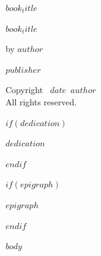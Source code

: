 \documentclass[12pt]{memoir}
\def\booktitle{$book_title$}
\def\bookauthor{$author$}
\def\bookdate{$date$}
\def\bookpublisher{$publisher$}
\begin{document}
\thispagestyle{empty}
\vspace*{2in}
{\Huge\scshape\booktitle}

\clearpage
\thispagestyle{empty}
\vspace*{1in}
\begin{center}
{\Huge\scshape\booktitle\par}
\vspace{0.5in}
{\Large by \bookauthor\par}
\vfill
{\large\scshape\bookpublisher}
\end{center}

\clearpage
\thispagestyle{empty}
\vspace*{\fill}
\begin{center}
Copyright \textcopyright\ \bookdate\ \bookauthor\\
\bigskip
All rights reserved.
\end{center}
\vspace*{\fill}

$if(dedication)$
\clearpage
\thispagestyle{empty}
\vspace*{3in}
\begin{center}
\textit{$dedication$}
\end{center}
$endif$

$if(epigraph)$
\clearpage
\begin{center}
\textit{$epigraph$}
\end{center}
$endif$

\clearpage
\tableofcontents

$body$
\end{document}
